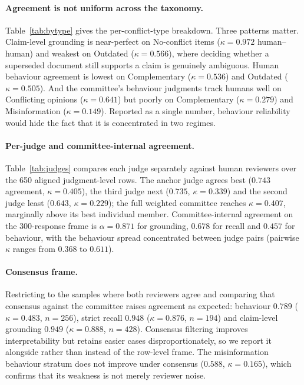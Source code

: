 

\paragraph{Agreement is not uniform across the taxonomy.} Table~\ref{tab:bytype}
gives the per-conflict-type breakdown. Three patterns matter. Claim-level
grounding is near-perfect on No-conflict items ($\kappa=0.972$ human--human) and
weakest on Outdated ($\kappa=0.566$), where deciding whether a superseded
document still supports a claim is genuinely ambiguous. Human behaviour agreement
is lowest on Complementary ($\kappa=0.536$) and Outdated ($\kappa=0.505$). And
the committee's behaviour judgments track humans well on Conflicting opinions
($\kappa=0.641$) but poorly on Complementary ($\kappa=0.279$) and Misinformation
($\kappa=0.149$). Reported as a single number, behaviour reliability would hide
the fact that it is concentrated in two regimes.

\paragraph{Per-judge and committee-internal agreement.} Table~\ref{tab:judges}
compares each judge separately against human reviewers over the 650 aligned
judgment-level rows.
The anchor judge agrees best ($0.743$ agreement, $\kappa=0.405$), the third judge
next ($0.735$, $\kappa=0.339$) and the second judge least ($0.643$,
$\kappa=0.229$); the full weighted committee reaches $\kappa=0.407$, marginally
above its best individual member. Committee-internal agreement on the
300-response frame is $\alpha=0.871$ for grounding, $0.678$ for recall and $0.457$ for
behaviour, with the behaviour spread concentrated between judge pairs (pairwise
$\kappa$ ranges from $0.368$ to $0.611$).

\paragraph{Consensus frame.} Restricting to the samples where both reviewers agree
and comparing that consensus against the committee raises agreement as expected:
behaviour $0.789$ ($\kappa=0.483$, $n=256$), strict recall $0.948$
($\kappa=0.876$, $n=194$) and claim-level grounding $0.949$ ($\kappa=0.888$,
$n=428$). Consensus filtering improves interpretability but retains easier cases
disproportionately, so we report it alongside rather than instead of the
row-level frame. The misinformation behaviour stratum does not improve under
consensus ($0.588$, $\kappa=0.165$), which confirms that its weakness is not
merely reviewer noise.

